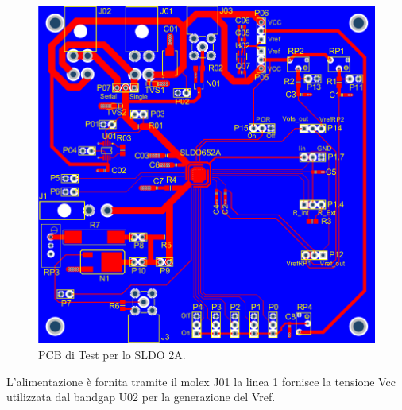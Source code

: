 \begin{figure}
\centering
\includegraphics[scale=.3]{Immagini/chipcard}
\caption{PCB di Test per lo SLDO 2A.}
\label{PCBTestSLDO}
\end{figure}


L'alimentazione è fornita tramite il molex J01 la linea 1 fornisce la tensione Vcc utilizzata dal bandgap U02 per la generazione del Vref.

